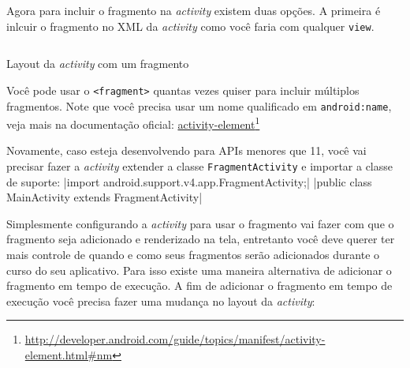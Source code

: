 \documentclass[a4paper,12pt,brazil,doubleside]{book}
\begin{document}
\begin{singlespace}

Agora para incluir o fragmento na \emph{activity} existem duas opções. A primeira é inlcuir o fragmento no XML da \emph{activity} como você faria com qualquer \texttt{view}.

\begin{listing}[H]
\inputminted[linenos=true,fontsize=\small,frame=lines, framesep=2mm, tabsize=2,numbersep=5pt]{xml}{src/design/fragment-activity.xml}
\caption{Layout da \emph{activity} com um fragmento}
\end{listing}	

Você pode usar o \texttt{<fragment>} quantas vezes quiser para incluir múltiplos fragmentos.
Note que você precisa usar um nome qualificado em \texttt{android:name}, veja mais na documentação oficial: \href{http://developer.android.com/guide/topics/manifest/activity-element.html\#nm}{activity-element}\footnote{\href{http://developer.android.com/guide/topics/manifest/activity-element.html\#nm}{http://developer.android.com/guide/topics/manifest/activity-element.html\#nm}}

Novamente, caso esteja desenvolvendo para APIs menores que 11, você vai precisar fazer a \emph{activity} extender a classe \texttt{FragmentActivity} e importar a classe de suporte: |import android.support.v4.app.FragmentActivity;|
|public class MainActivity extends FragmentActivity|


Simplesmente configurando a \emph{activity} para usar o fragmento vai fazer com que o fragmento seja adicionado e renderizado na tela, entretanto você deve querer ter mais controle de quando e como seus fragmentos serão adicionados durante o curso do seu aplicativo. Para isso existe uma maneira alternativa de adicionar o fragmento em tempo de execução. A fim de adicionar o fragmento em tempo de execução você precisa fazer uma mudança no layout da \emph{activity}:


\end{singlespace}
\end{document}
